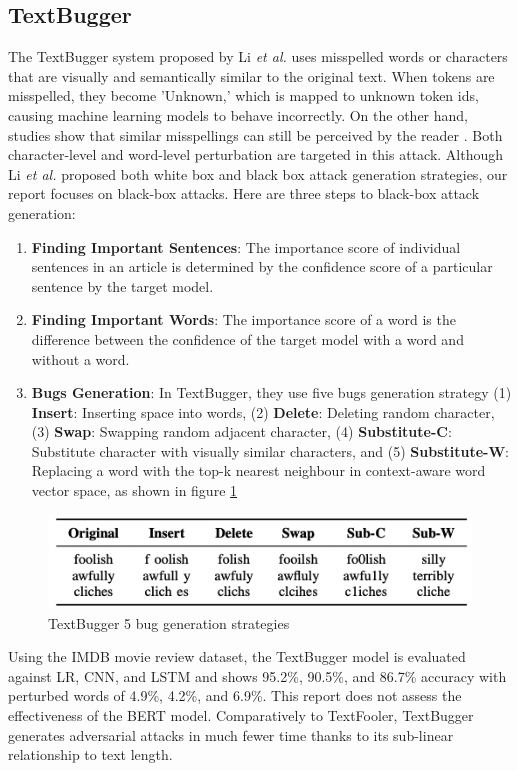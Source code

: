 \documentclass[%
	BCOR=8mm, %
	DIV=12,
	toc=bibliography, %
	toc=listof, %
	oneside, %
	egregdoesnotlikesansseriftitles, %
	]{scrbook}
\begin{document}
\subsection{TextBugger}
\label{subsection:textbugger}
The TextBugger system proposed by Li \textit{et al.} \cite{li_textbugger_2019} uses misspelled words or characters that are visually and semantically similar to the original text. When tokens are misspelled, they become 'Unknown,' which is mapped to unknown token ids, causing machine learning models to behave incorrectly. On the other hand, studies show that similar misspellings can still be perceived by the reader \cite{rawlinson_significance_2007,alzantot_generating_2018}. Both character-level and word-level perturbation are targeted in this attack. Although Li \textit{et al.} \cite{li_textbugger_2019}  proposed both white box and black box attack generation strategies, our report focuses on black-box attacks. Here are three steps to black-box attack generation:
\begin{enumerate}
    \item \textbf{Finding Important Sentences}: The importance score of individual sentences in an article is determined by the confidence score of a particular sentence by the target model.
    \item \textbf{Finding Important Words}: The importance score of a word is the difference between the confidence of the target model with a word and without a word.
    \item \textbf{Bugs Generation}: In TextBugger, they use five bugs generation strategy (1) \textbf{Insert}: Inserting space into words, (2) \textbf{Delete}: Deleting random character,
    (3) \textbf{Swap}: Swapping random adjacent character, (4) \textbf{Substitute-C}: Substitute character with visually similar characters, and (5)\textbf{ Substitute-W}: Replacing a word with the top-k nearest neighbour in context-aware word vector space, as shown in figure \ref{diag:textbug}
\end{enumerate}

\begin{figure}[H]
    \centering
    \includegraphics[width=.7\textwidth]{img/textbugger_5strat.png}
    \caption[Example of 5 bug generation strategies of TextBugger]{TextBugger 5 bug generation strategies \cite{li_textbugger_2019} }
    \label{diag:textbug}
\end{figure}
Using the IMDB movie review dataset, the TextBugger model is evaluated against LR, CNN, and LSTM and shows 95.2\%, 90.5\%, and 86.7\% accuracy with perturbed words of 4.9\%, 4.2\%, and 6.9\%. This report does not assess the effectiveness of the BERT model. Comparatively to TextFooler, TextBugger generates adversarial attacks in much fewer time thanks to its sub-linear relationship to text length.
\end{document}
